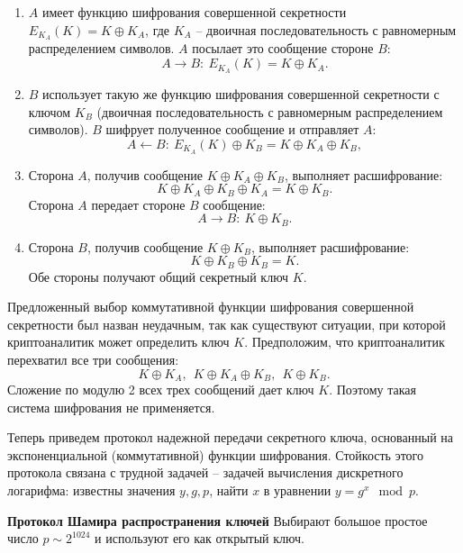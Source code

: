 \begin{enumerate}
    \item $A$ имеет функцию шифрования совершенной секретности $E_{K_A}(K) = K \oplus K_A$, где $K_A$ -- двоичная последовательность с равномерным распределением символов. $A$ посылает это сообщение стороне $B$:
            \[ A \rightarrow B: ~ E_{K_A}(K) = K \oplus K_A. \]
    \item $B$ использует такую же функцию шифрования совершенной секретности с ключом $K_B$ (двоичная последовательность с равномерным распределением символов). $B$ шифрует полученное сообщение и отправляет $A$:
            \[ A \leftarrow B: ~ E_{K_A}(K) \oplus K_B = K \oplus K_A \oplus K_B, \]
    \item Сторона $A$, получив сообщение $K \oplus K_A \oplus K_B$, выполняет расшифрование:
            \[ K \oplus K_A \oplus K_B \oplus K_A = K \oplus K_B. \]
        Сторона $A$ передает стороне $B$ сообщение:
            \[ A \rightarrow B: ~ K \oplus K_B. \]
    \item Сторона $B$, получив сообщение $K \oplus K_B$, выполняет расшифрование:
            \[ K \oplus K_B \oplus K_B = K. \]
        Обе стороны получают общий секретный ключ $K$.
\end{enumerate}

Предложенный выбор коммутативной функции шифрования совершенной секретности был назван неудачным, так как существуют ситуации, при которой криптоаналитик может определить ключ $K$. Предположим, что криптоаналитик перехватил все три сообщения:
    \[ K \oplus K_A, ~~ K \oplus K_A \oplus K_B, ~~ K \oplus K_B. \]
Сложение по модулю 2 всех трех сообщений дает ключ $K$. Поэтому такая система шифрования не применяется.

Теперь приведем протокол надежной  передачи секретного ключа, основанный на экспоненциальной (коммутативной) функции шифрования. Стойкость этого протокола связана с трудной задачей -- задачей вычисления дискретного логарифма: известны значения $y, g, p$, найти $x$ в уравнении $y = g^x \mod p$.

\textbf{Протокол Шамира распространения ключей}
Выбирают большое простое число $p\sim 2^{1024}$ и используют его как открытый ключ.

